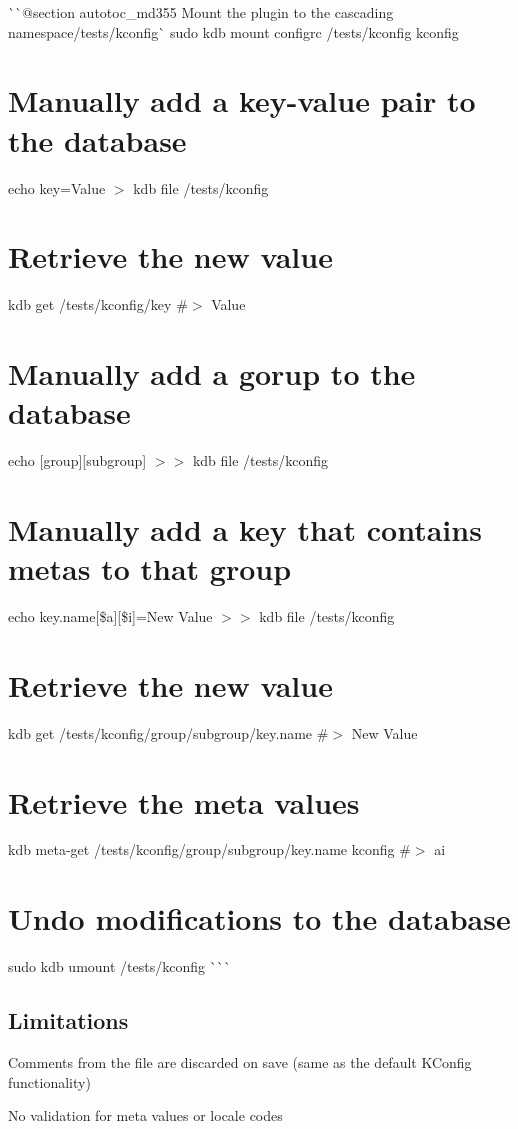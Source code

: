 \`{}\`{}{\ttfamily  @section autotoc\+\_\+md355 Mount the plugin to the cascading namespace}/tests/kconfig\`{} sudo kdb mount configrc /tests/kconfig kconfig\hypertarget{autotoc_md353_autotoc_md356}{}\section{Manually add a key-\/value pair to the database}\label{autotoc_md353_autotoc_md356}
echo \textquotesingle{}key=Value\textquotesingle{} $>$ {\ttfamily kdb file /tests/kconfig}\hypertarget{autotoc_md353_autotoc_md357}{}\section{Retrieve the new value}\label{autotoc_md353_autotoc_md357}
kdb get /tests/kconfig/key \#$>$ Value\hypertarget{autotoc_md353_autotoc_md358}{}\section{Manually add a gorup to the database}\label{autotoc_md353_autotoc_md358}
echo \textquotesingle{}\mbox{[}group\mbox{]}\mbox{[}subgroup\mbox{]}\textquotesingle{} $>$$>$ {\ttfamily kdb file /tests/kconfig}\hypertarget{autotoc_md353_autotoc_md359}{}\section{Manually add a key that contains metas to that group}\label{autotoc_md353_autotoc_md359}
echo \textquotesingle{}key.\+name\mbox{[}\$a\mbox{]}\mbox{[}\$i\mbox{]}=New Value\textquotesingle{} $>$$>$ {\ttfamily kdb file /tests/kconfig}\hypertarget{autotoc_md353_autotoc_md360}{}\section{Retrieve the new value}\label{autotoc_md353_autotoc_md360}
kdb get /tests/kconfig/group/subgroup/key.name \#$>$ New Value\hypertarget{autotoc_md353_autotoc_md361}{}\section{Retrieve the meta values}\label{autotoc_md353_autotoc_md361}
kdb meta-\/get /tests/kconfig/group/subgroup/key.name kconfig \#$>$ ai\hypertarget{autotoc_md353_autotoc_md362}{}\section{Undo modifications to the database}\label{autotoc_md353_autotoc_md362}
sudo kdb umount /tests/kconfig \`{}\`{}\`{}\hypertarget{autotoc_md353_autotoc_md363}{}\subsection{Limitations}\label{autotoc_md353_autotoc_md363}

\begin{DoxyItemize}
\item Comments from the file are discarded on save (same as the default K\+Config functionality)
\item No validation for meta values or locale codes 
\end{DoxyItemize}